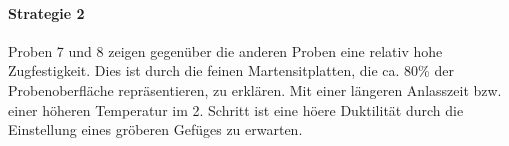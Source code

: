 \paragraph{Strategie 2}
Proben 7 und 8 zeigen gegenüber die anderen Proben eine relativ hohe Zugfestigkeit.  Dies ist durch die feinen Martensitplatten, die ca. 80\% der Probenoberfläche repräsentieren, zu erklären.
Mit einer längeren Anlasszeit bzw. einer höheren Temperatur im 
2. Schritt ist eine höere Duktilität durch die Einstellung eines gröberen Gefüges  zu erwarten.
\newline

















